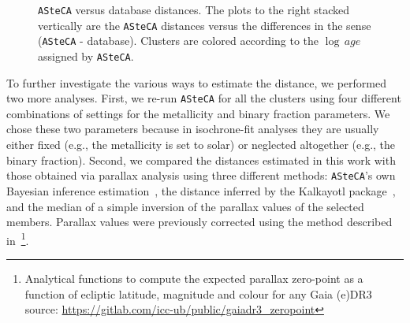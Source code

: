 \documentclass[referee]{aa}
\begin{document}
  \begin{figure}
   \caption{\texttt{ASteCA} versus database distances. The plots to the right
   stacked vertically are the \texttt{ASteCA} distances versus the differences
   in the sense (\texttt{ASteCA} - database). Clusters are colored according to
   the $\log\,age$ assigned by \texttt{ASteCA}.}
   \label{fig:distances}
  \end{figure}

  To further investigate the various ways to estimate the distance, we performed
  two more analyses. First, we re-run \texttt{ASteCA} for all the
  clusters using four different combinations of settings for the metallicity and
  binary fraction parameters. We chose these two parameters because in
  isochrone-fit analyses they are usually either fixed (e.g., the metallicity is
  set to solar) or neglected altogether (e.g., the binary fraction).
  Second, we compared the distances estimated in this work with those obtained
  via parallax analysis using three different methods: \texttt{ASteCA}'s own
  Bayesian inference estimation~\citep[described in][]{Perren_2020}, the
  distance inferred by the Kalkayotl package~\citep{Kalkayotl}, and the median
  of a simple inversion of the parallax values of the selected members.
  Parallax values were previously corrected using the method described
  in~\cite{Lindegren_2021}\footnote{ Analytical functions to compute the
  expected parallax zero-point as a function of ecliptic latitude, magnitude and
  colour for any Gaia (e)DR3
  source: \url{https://gitlab.com/icc-ub/public/gaiadr3_zeropoint}}.
\end{document}
